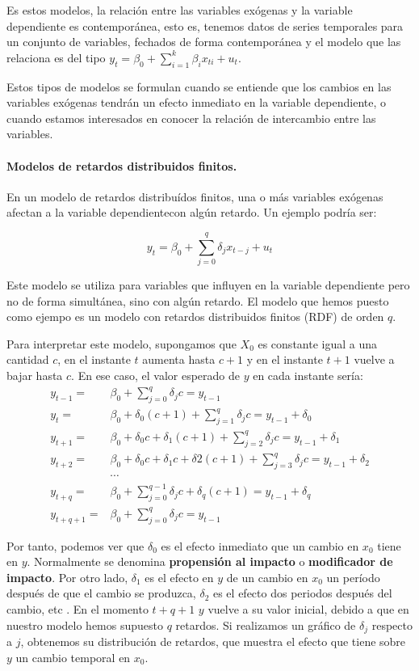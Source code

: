 Es estos modelos, la relaci\'on entre las variables ex\'ogenas y la variable dependiente es contempor\'anea, esto es, tenemos datos de series temporales para un conjunto de variables, fechados de forma contempor\'anea y el modelo que las relaciona es del tipo $y_t=\beta_0+\sum_{i=1}^k\beta_ix_{ti}+u_t$.

Estos tipos de modelos se formulan cuando se entiende que los cambios en las variables ex\'ogenas tendr\'an un efecto inmediato en la variable dependiente, o cuando estamos interesados en conocer la relaci\'on de intercambio entre las variables.

\paragraph{Modelos de retardos distribuidos finitos.}

En un modelo de retardos distribu\'idos finitos, una o m\'as variables ex\'ogenas afectan a la variable dependientecon alg\'un retardo. Un ejemplo podr\'ia ser:

\[ y_t=\beta_0+\sum_{j=0}^{q}\delta_jx_{t-j}+u_t\]

Este modelo se utiliza para variables que influyen en la variable dependiente pero no de forma simult\'anea, sino con alg\'un retardo. El modelo que hemos puesto como ejempo es un modelo con retardos distribuidos finitos (RDF) de orden $q$.

Para interpretar este modelo, supongamos que $X_0$ es constante igual a una cantidad $c$, en  el instante  $t$ aumenta hasta $c+1$ y en el instante $t+1$ vuelve a bajar hasta $c$. En ese caso, el valor esperado de $y$ en cada instante ser\'ia:
\begin{align*}
 y_{t-1}=&\beta_0+\sum_{j=0}^{q}\delta_jc = y_{t-1} \\
 y_{t}=&\beta_0+\delta_0(c+1)+\sum_{j=1}^{q}\delta_jc = y_{t-1}+\delta_0 \\
 y_{t+1}=&\beta_0+\delta_0c+\delta_1(c+1)+\sum_{j=2}^{q}\delta_jc = y_{t-1}+\delta_1 \\
 y_{t+2}=&\beta_0+\delta_0c+\delta_1c+\delta2(c+1)+\sum_{j=3}^{q}\delta_jc = y_{t-1}+\delta_2 \\
 &\cdots \\
 y_{t+q}=&\beta_0+\sum_{j=0}^{q-1}\delta_jc+\delta_q(c+1) = y_{t-1} +\delta_q\\
  y_{t+q+1}=&\beta_0+\sum_{j=0}^{q}\delta_jc = y_{t-1}
\end{align*}

Por tanto, podemos ver que $\delta_0$ es el efecto inmediato que un cambio en $x_0$ tiene en $y$. Normalmente se denomina \textbf{propensi\'on al impacto} o \textbf{modificador de impacto}. Por otro lado, $\delta_1$ es el efecto en $y$ de un cambio en $x_0$ un per\'iodo despu\'es de que el cambio se produzca, $\delta_2$ es el efecto dos periodos despu\'es del cambio, etc . En el momento $t+q+1$ $y$ vuelve a su valor inicial, debido a que en nuestro modelo hemos supuesto $q$ retardos. Si realizamos un gr\'afico de $\delta_j$ respecto a $j$, obtenemos su distribuci\'on de retardos, que muestra el efecto que tiene sobre $y$ un cambio temporal en $x_0$.

